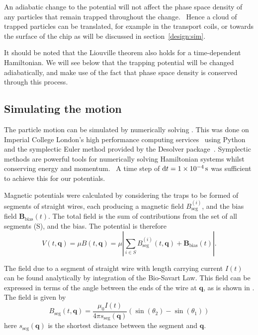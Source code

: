 
An adiabatic change to the potential will not affect the phase space density of
any particles that remain trapped throughout the change.~\cite{Hand1998,
Lichtenberg1969} Hence a cloud of trapped particles can be translated, for
example in the transport coils, or towards the surface of the chip as will be
discussed in section~\ref{design:sim}.

It should be noted that the Liouville theorem also holds for a time-dependent
Hamiltonian. We will see below that the trapping potential will be changed
adiabatically, and make use of the fact that phase space density is conserved
through this process.

\subsection{Simulating the motion}
\label{design:motion:simmethods}


The particle motion can be simulated by numerically solving
. This was done on Imperial College London's high
performance computing services~\cite{ICRCS} using Python~\cite{python} and the
symplectic Euler method provided by the Desolver package~\cite{desolver}.
Symplectic methods are powerful tools for numerically solving Hamiltonian
systems whilst conserving energy and momentum.~\cite{Hairer2015,
doi:10.1119/1.2034523} A time step of $\dd t = \SI{1E-4}{\second}$ was
sufficient to achieve this for our potentials.

Magnetic potentials were calculated by considering the traps to be formed of
segments of straight wires, each producing a magnetic field
$B_\text{seg}^{(i)}$, and the bias field $\mathbf{B}_\text{bias}(t)$. The total
field is the sum of contributions from the set of all segments (S), and the
bias. The potential is therefore
%
\begin{equation} V(t, \mathbf{q}) = \mu B (t, \mathbf{q}) = \mu \left|
  \sum_{i\in S}
B_\text{seg}^{(i)}(t, \mathbf{q}) + \mathbf{B}_\text{bias}(t)\right|.
\end{equation}

The field due to a segment of straight wire with length carrying current $I(t)$
can be found analytically by integration of the Bio-Savart Law.
This field can be expressed in terms of the angle between the ends of the wire
at $\mathbf{q}$, as is shown in . The field
is given by~\cite{Griffiths2017}
%
\begin{equation}
  B_\text{seg}(t, \mathbf{q}) = \frac{\mu_0 I(t)}{4\pi
  s_\text{seg}(\mathbf{q})} (\sin(\theta_2)  - \sin(\theta_1))
\label{design:eq:segmentfield}
\end{equation}
here $s_\text{seg}(\mathbf{q})$ is the shortest distance between the segment
and $\mathbf{q}$.


